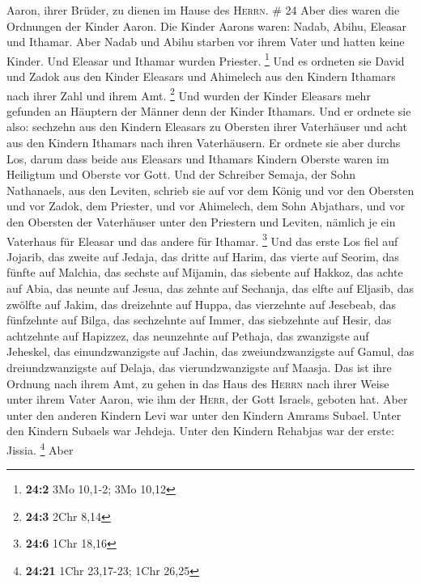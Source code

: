 Aaron, ihrer Brüder, zu dienen im Hause des \textsc{Herrn}. \# 24
 Aber dies waren die Ordnungen der Kinder Aaron. Die
Kinder Aarons waren: Nadab, Abihu, Eleasar und Ithamar. 
Aber Nadab und Abihu starben vor ihrem Vater und hatten keine Kinder.
Und Eleasar und Ithamar wurden Priester. \footnote{\textbf{24:2} 3Mo
  10,1-2; 3Mo 10,12}  Und es ordneten sie David und Zadok
aus den Kinder Eleasars und Ahimelech aus den Kindern Ithamars nach
ihrer Zahl und ihrem Amt. \footnote{\textbf{24:3} 2Chr 8,14}
 Und wurden der Kinder Eleasars mehr gefunden an Häuptern
der Männer denn der Kinder Ithamars. Und er ordnete sie also: sechzehn
aus den Kindern Eleasars zu Obersten ihrer Vaterhäuser und acht aus den
Kindern Ithamars nach ihren Vaterhäusern.  Er ordnete sie
aber durchs Los, darum dass beide aus Eleasars und Ithamars Kindern
Oberste waren im Heiligtum und Oberste vor Gott.  Und der
Schreiber Semaja, der Sohn Nathanaels, aus den Leviten, schrieb sie auf
vor dem König und vor den Obersten und vor Zadok, dem Priester, und vor
Ahimelech, dem Sohn Abjathars, und vor den Obersten der Vaterhäuser
unter den Priestern und Leviten, nämlich je ein Vaterhaus für Eleasar
und das andere für Ithamar. \footnote{\textbf{24:6} 1Chr 18,16}
 Und das erste Los fiel auf Jojarib, das zweite auf
Jedaja,  das dritte auf Harim, das vierte auf Seorim,
 das fünfte auf Malchia, das sechste auf Mijamin,
 das siebente auf Hakkoz, das achte auf Abia,
 das neunte auf Jesua, das zehnte auf Sechanja,
 das elfte auf Eljasib, das zwölfte auf Jakim,
 das dreizehnte auf Huppa, das vierzehnte auf Jesebeab,
 das fünfzehnte auf Bilga, das sechzehnte auf Immer,
 das siebzehnte auf Hesir, das achtzehnte auf Hapizzez,
 das neunzehnte auf Pethaja, das zwanzigste auf Jeheskel,
 das einundzwanzigste auf Jachin, das zweiundzwanzigste
auf Gamul,  das dreiundzwanzigste auf Delaja, das
vierundzwanzigste auf Maasja.  Das ist ihre Ordnung nach
ihrem Amt, zu gehen in das Haus des \textsc{Herrn} nach ihrer Weise
unter ihrem Vater Aaron, wie ihm der \textsc{Herr}, der Gott Israels,
geboten hat.  Aber unter den anderen Kindern Levi war
unter den Kindern Amrams Subael. Unter den Kindern Subaels war Jehdeja.
 Unter den Kindern Rehabjas war der erste: Jissia.
\footnote{\textbf{24:21} 1Chr 23,17-23; 1Chr 26,25}  Aber
